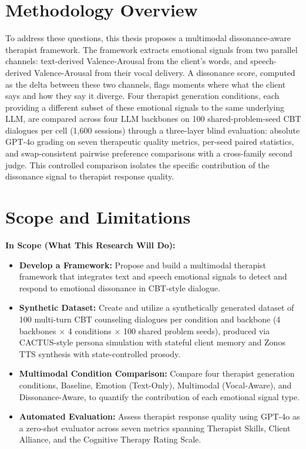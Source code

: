 \section{Methodology Overview}

To address these questions, this thesis proposes a multimodal dissonance-aware therapist framework. The framework extracts emotional signals from two parallel channels: text-derived Valence-Arousal from the client's words, and speech-derived Valence-Arousal from their vocal delivery. A dissonance score, computed as the delta between these two channels, flags moments where what the client says and how they say it diverge. Four therapist generation conditions, each providing a different subset of these emotional signals to the same underlying LLM, are compared across four LLM backbones on 100 shared-problem-seed CBT dialogues per cell (1,600 sessions) through a three-layer blind evaluation: absolute GPT-4o grading on seven therapeutic quality metrics, per-seed paired statistics, and swap-consistent pairwise preference comparisons with a cross-family second judge. This controlled comparison isolates the specific contribution of the dissonance signal to therapist response quality.

\section{Scope and Limitations}

\textbf{In Scope (What This Research Will Do):}
\begin{itemize}
    \item \textbf{Develop a Framework:} Propose and build a multimodal therapist framework that integrates text and speech emotional signals to detect and respond to emotional dissonance in CBT-style dialogue.
    \item \textbf{Synthetic Dataset:} Create and utilize a synthetically generated dataset of 100 multi-turn CBT counseling dialogues per condition and backbone (4 backbones $\times$ 4 conditions $\times$ 100 shared problem seeds), produced via CACTUS-style persona simulation with stateful client memory and Zonos TTS synthesis with state-controlled prosody.
    \item \textbf{Multimodal Condition Comparison:} Compare four therapist generation conditions, Baseline, Emotion (Text-Only), Multimodal (Vocal-Aware), and Dissonance-Aware, to quantify the contribution of each emotional signal type.
    \item \textbf{Automated Evaluation:} Assess therapist response quality using GPT-4o as a zero-shot evaluator across seven metrics spanning Therapist Skills, Client Alliance, and the Cognitive Therapy Rating Scale.
\end{itemize}


